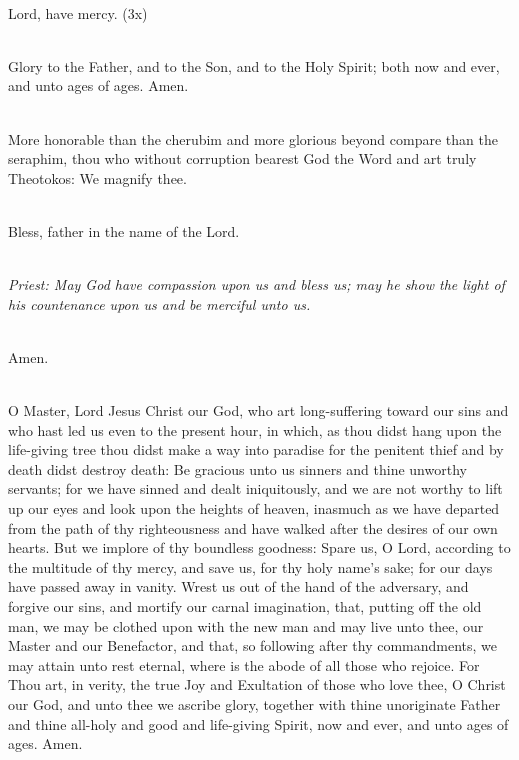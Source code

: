 {\mbox{}\\
Lord, have mercy. (3x)

\mbox{}\\
Glory to the Father, and to the Son, and to the Holy Spirit;
both now and ever, and unto ages of ages. Amen. 

\mbox{}\\
More honorable than the cherubim and more glorious beyond compare than 
the seraphim, thou who without corruption bearest God the Word and art truly 
Theotokos: We magnify thee.

\mbox{}\\
Bless, father in the name of the Lord. 

\mbox{}\\
\emph{Priest: May God have compassion upon us and bless us;
may he show the light of his countenance upon us and be merciful unto us.}

\mbox{}\\
Amen. 

\mbox{}\\
O Master, Lord Jesus Christ our God, who art long-suffering toward our sins 
and who hast led us even to the present hour, in which, as thou didst hang 
upon the life-giving tree thou didst make a way into paradise for the penitent 
thief and by death didst destroy death: Be gracious unto us sinners and thine 
unworthy servants; for we have sinned and dealt iniquitously, and we are not 
worthy to lift up our eyes and look upon the heights of heaven, inasmuch as 
we have departed from the path of thy righteousness and have walked after the 
desires of our own hearts. But we implore of thy boundless goodness: Spare 
us, O Lord, according to the multitude of thy mercy, and save us, for thy holy 
name’s sake; for our days have passed away in vanity. Wrest us out of the 
hand of the adversary, and forgive our sins, and mortify our carnal 
imagination, that, putting off the old man, we may be clothed upon with the 
new man and may live unto thee, our Master and our Benefactor, and that, so 
following after thy commandments, we may attain unto rest eternal, where is 
the abode of all those who rejoice. For Thou art, in verity, the true Joy and 
Exultation of those who love thee, O Christ our God, and unto thee we ascribe 
glory, together with thine unoriginate Father and thine all-holy and good and 
life-giving Spirit, now and ever, and unto ages of ages. Amen. 
}

